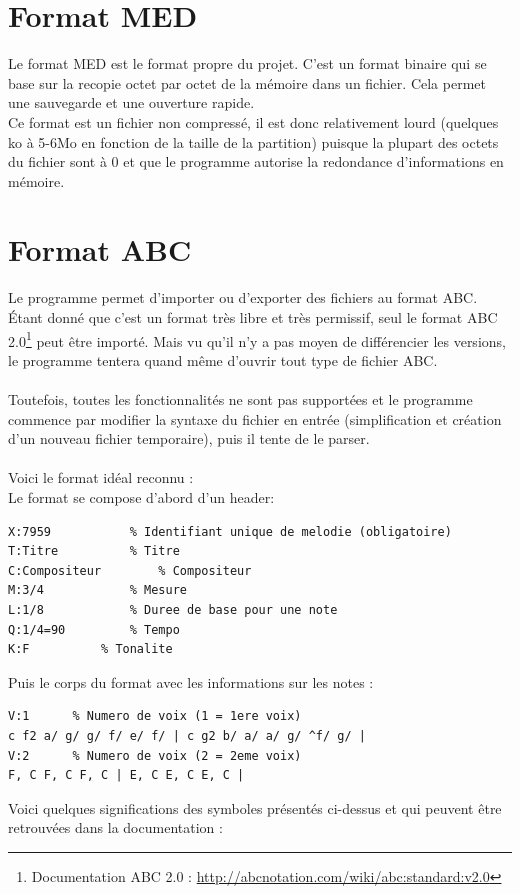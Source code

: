 \documentclass[12pt]{report}
\begin{document}
\section{Format MED}
Le format MED est le format propre du projet. C'est un format binaire qui se base sur la recopie octet par octet de la mémoire dans un fichier. Cela permet une sauvegarde et une ouverture rapide.\\
Ce format est un fichier non compressé, il est donc relativement lourd (quelques ko à 5-6Mo en fonction de la taille de la partition) puisque la plupart des octets du fichier sont à 0 et que le programme
autorise la redondance d'informations en mémoire. \\

\section{Format ABC}
Le programme permet d'importer ou d'exporter des fichiers au format ABC. Étant donné que c'est un format très libre et très permissif, 
seul le format ABC 2.0\footnote{Documentation ABC 2.0 : \url{http://abcnotation.com/wiki/abc:standard:v2.0}} peut être importé. Mais vu qu'il n'y a pas moyen de différencier les versions,
le programme tentera quand même d'ouvrir tout type de fichier ABC.\\ \\
Toutefois, toutes les fonctionnalités ne sont pas supportées et le programme commence par modifier la syntaxe du fichier en entrée (simplification et création d'un nouveau fichier temporaire),
puis il tente de le parser.\\\\
Voici le format idéal reconnu :\\\vskip 0.3in
Le format se compose d'abord d'un header: \\
\begin{lstlisting}[language=Tex]
X:7959		     % Identifiant unique de melodie (obligatoire)
T:Titre		     % Titre
C:Compositeur	     % Compositeur
M:3/4		     % Mesure
L:1/8		     % Duree de base pour une note
Q:1/4=90 	     % Tempo
K:F		     % Tonalite
\end{lstlisting}\vskip 0.3in
Puis le corps du format avec les informations sur les notes :\\
\begin{lstlisting}[language=Tex]
V:1	  	 % Numero de voix (1 = 1ere voix)
c f2 a/ g/ g/ f/ e/ f/ | c g2 b/ a/ a/ g/ ^f/ g/ |
V:2		 % Numero de voix (2 = 2eme voix)
F, C F, C F, C | E, C E, C E, C |
\end{lstlisting}
\vskip 0.6in
\newpage
Voici quelques significations des symboles présentés ci-dessus et qui peuvent être retrouvées dans la documentation :
\end{document}
